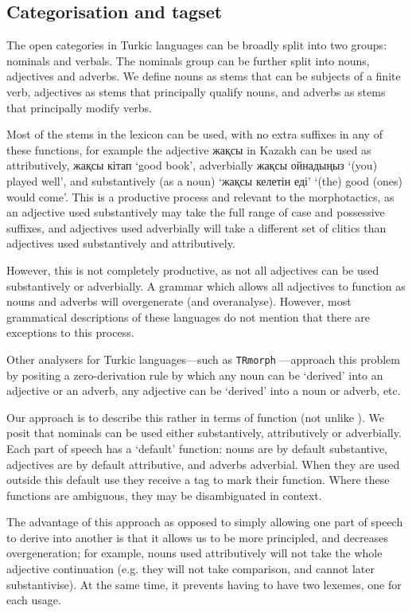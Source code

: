 \documentclass[a4paper,11pt,twocolumn]{article}
\begin{document}
\subsection{Categorisation and tagset}

The open categories in Turkic languages can be broadly split into two groups: nominals
and verbals. The nominals group can be further split into nouns, adjectives and adverbs.
We define nouns as stems that can be subjects of a finite verb, adjectives as stems that principally qualify 
nouns, and adverbs as stems that principally modify verbs.

Most of the stems in the lexicon can be used, with no extra suffixes in any of these functions, for 
example the adjective жақсы in Kazakh can be used as attributively, жақсы кітап `good book', adverbially
жақсы ойнадыңыз `(you) played well', and substantively (as a noun) `жақсы келетін еді' `(the) good (ones) would come'. This
is a productive process and relevant to the morphotactics, as an adjective used substantively may take the 
full range of case and possessive suffixes, and adjectives used adverbially will take a different set of 
clitics than adjectives used substantively and attributively. 

However, this is not completely productive, as not all adjectives can be used substantively or adverbially. A grammar which allows all adjectives to function
as nouns and adverbs will overgenerate (and overanalyse). However, most grammatical descriptions of these languages do not 
mention that there are exceptions to this process.

Other analysers for Turkic languages---such as \texttt{TRmorph} \citep{coltekin2010}---approach this 
problem by positing a zero-derivation rule by which any noun can be `derived' into an adjective or 
an adverb, any adjective can be `derived' into a noun or adverb, etc. 

Our approach is to describe this rather in terms of function (not unlike \cite{hengeveld92}). We 
posit that nominals can be used either substantively, attributively or adverbially. Each part of speech 
has a `default' function: nouns are by default substantive, adjectives are by default attributive, 
and adverbs adverbial. When they are used outside this default use they receive a tag to mark 
their function. Where these functions are ambiguous, they may be disambiguated 
in context. 

The advantage of this approach as opposed to simply allowing one part of speech to derive into
another is that it allows us to be more principled, and decreases overgeneration;
for example, nouns used attributively will not take the whole adjective continuation (e.g.
they will not take comparison, and cannot later substantivise). At the same time, it prevents 
having to have two lexemes, one for each usage.
\end{document}
